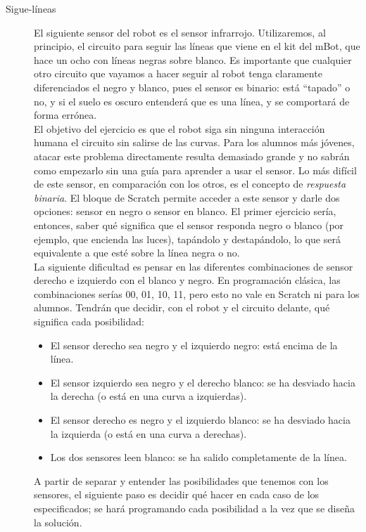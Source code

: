 \begin{description}
\item[Sigue-líneas]\label{ej:sigueLineas}
El siguiente sensor del robot es el sensor infrarrojo.
Utilizaremos, al principio, el circuito para seguir las líneas que viene en el kit del mBot, que hace un ocho con líneas negras sobre blanco. Es importante que cualquier otro circuito que vayamos a hacer seguir al robot tenga claramente diferenciados el negro y blanco, pues el sensor es binario: está ``tapado'' o no, y si el suelo es oscuro entenderá que es una línea, y se comportará de forma errónea.\\
El objetivo del ejercicio es que el robot siga sin ninguna interacción humana el circuito sin salirse de las curvas. Para los alumnos más jóvenes, atacar este problema directamente resulta demasiado grande y no sabrán como empezarlo sin una guía para aprender a usar el sensor. Lo más difícil de este sensor, en comparación con los otros, es el concepto de \textit{respuesta binaria}. El bloque de Scratch permite acceder a este sensor y darle dos opciones: sensor en negro o sensor en blanco. El primer ejercicio sería, entonces, saber qué significa que el sensor responda negro o blanco (por ejemplo, que encienda las luces), tapándolo y destapándolo, lo que será equivalente a que esté sobre la línea negra o no.\\
La siguiente dificultad es pensar en las diferentes combinaciones de sensor derecho e izquierdo con el blanco y negro. En programación clásica, las combinaciones serías 00, 01, 10, 11, pero esto no vale en Scratch ni para los alumnos. Tendrán que decidir, con el robot y el circuito delante, qué significa cada posibilidad:
\begin{itemize}
	\item El sensor derecho sea negro y el izquierdo negro: está encima de la línea.
	\item El sensor izquierdo sea negro y el derecho blanco: se ha desviado hacia la derecha (o está en una curva a izquierdas).
	\item El sensor derecho es negro y el izquierdo blanco: se ha desviado hacia la izquierda (o está en una curva a derechas).
	\item Los dos sensores leen blanco: se ha salido completamente de la línea.
\end{itemize}
A partir de separar y entender las posibilidades que tenemos con los sensores, el siguiente paso es decidir qué hacer en cada caso de los especificados; se hará programando cada posibilidad a la vez que se diseña la solución.
\begin{itemize}

\end{itemize}
\end{description}
